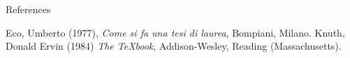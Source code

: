 \begin{frame}{References}
    \begin{thebibliography}{9}
         Eco, Umberto (1977),
        \emph{Come si fa una tesi di laurea}, Bompiani, Milano.
         Knuth, Donald Ervin (1984)
        \emph{The \TeX\-book}, Addison-Wesley, Reading (Massachusetts).
    \end{thebibliography}
\end{frame}
